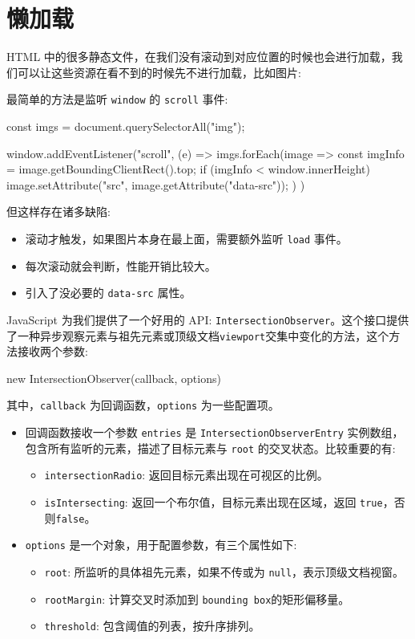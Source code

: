 \section{懒加载}

HTML 中的很多静态文件，在我们没有滚动到对应位置的时候也会进行加载，我们可以让这些资源在看不到的时候先不进行加载，比如图片:

最简单的方法是监听 \texttt{window} 的 \texttt{scroll} 事件:

\begin{JavaScript}
const imgs = document.querySelectorAll("img");

window.addEventListener("scroll", (e) => {
  imgs.forEach(image => {
    const imgInfo = image.getBoundingClientRect().top;
    if (imgInfo < window.innerHeight) {
      image.setAttribute("src", image.getAttribute("data-src"));
    }
  })
})
\end{JavaScript}

但这样存在诸多缺陷:
\begin{itemize}
  \item 滚动才触发，如果图片本身在最上面，需要额外监听 \texttt{load} 事件。
  \item 每次滚动就会判断，性能开销比较大。
  \item 引入了没必要的 \texttt{data-src} 属性。
\end{itemize}

JavaScript 为我们提供了一个好用的 API: \texttt{IntersectionObserver}。这个接口提供了一种异步观察元素与祖先元素或顶级文档\texttt{viewport}交集中变化的方法，这个方法接收两个参数:

\begin{JavaScript}
new IntersectionObserver(callback, options)
\end{JavaScript}

其中，\texttt{callback} 为回调函数，\texttt{options} 为一些配置项。
\begin{itemize}
  \item 回调函数接收一个参数 \texttt{entries} 是 \texttt{IntersectionObserverEntry} 实例数组，包含所有监听的元素，描述了目标元素与 \texttt{root} 的交叉状态。比较重要的有:
  \begin{itemize}
    \item \texttt{intersectionRadio}: 返回目标元素出现在可视区的比例。
    \item \texttt{isIntersecting}: 返回一个布尔值，目标元素出现在区域，返回 \texttt{true}，否则\texttt{false}。
  \end{itemize}
  \item \texttt{options} 是一个对象，用于配置参数，有三个属性如下:
  \begin{itemize}
    \item \texttt{root}: 所监听的具体祖先元素，如果不传或为 \texttt{null}，表示顶级文档视窗。
    \item \texttt{rootMargin}: 计算交叉时添加到 \texttt{bounding box}的矩形偏移量。
    \item \texttt{threshold}: 包含阈值的列表，按升序排列。
  \end{itemize}
\end{itemize}

